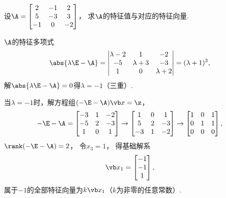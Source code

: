 \begin{example}
设\(\A = \begin{bmatrix} 2 & -1 & 2 \\ 5 & -3 & 3 \\ -1 & 0 & -2 \end{bmatrix}\)，
求\(\A\)的特征值与对应的特征向量.
\begin{solution}
\(\A\)的特征多项式\[
	\abs{\lambda\E-\A}
	= \begin{vmatrix}
		\lambda-2 & 1 & -2 \\
		-5 & \lambda+3 & -3 \\
		1 & 0 & \lambda+2
	\end{vmatrix}
	= (\lambda+1)^3,
\]
解\(\abs{\lambda\E-\A}=0\)得\(\lambda=-1\)（三重）.

当\(\lambda=-1\)时，解方程组\((-\E-\A)\x=\z\)，\[
	-\E-\A = \begin{bmatrix} -3 & 1 & -2 \\ -5 & 2 & -3 \\ 1 & 0 & 1 \end{bmatrix}
	\to \begin{bmatrix} 1 & 0 & 1 \\ 5 & 2 & -3 \\ -3 & 1 & -2 \end{bmatrix}
	\to \begin{bmatrix} 1 & 0 & 1 \\ 0 & 1 & 1 \\ 0 & 0 & 0 \end{bmatrix},
\]
\(\rank(-\E-\A)=2\)，
令\(x_3=1\)，
得基础解系\[
	\x_1=\begin{bmatrix} -1 \\ -1 \\ 1 \end{bmatrix},
\]
属于\(-1\)的全部特征向量为\(k\x_1\)（\(k\)为非零的任意常数）.
\end{solution}
\end{example}

